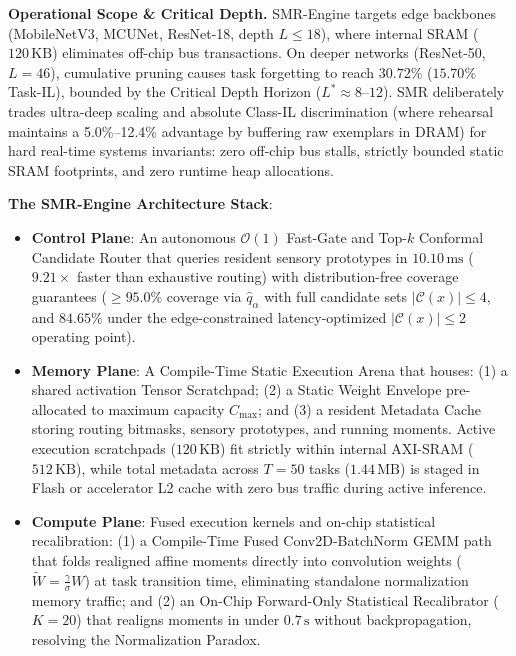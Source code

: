 \documentclass{article}
\begin{document}
\noindent\textbf{Operational Scope \& Critical Depth.} SMR-Engine targets edge backbones (MobileNetV3, MCUNet, ResNet-18, depth $L \le 18$), where internal SRAM ($120\,\text{KB}$) eliminates off-chip bus transactions. On deeper networks (ResNet-50, $L=46$), cumulative pruning causes task forgetting to reach $30.72\%$ ($15.70\%$ Task-IL), bounded by the Critical Depth Horizon ($L^* \approx 8\text{--}12$). SMR deliberately trades ultra-deep scaling and absolute Class-IL discrimination (where rehearsal maintains a 5.0\%--12.4\% advantage by buffering raw exemplars in DRAM) for hard real-time systems invariants: zero off-chip bus stalls, strictly bounded static SRAM footprints, and zero runtime heap allocations.

\noindent\textbf{The SMR-Engine Architecture Stack}:
\begin{itemize}\itemsep 0.5pt \parsep 0pt
    \item \textbf{Control Plane}: An autonomous $\mathcal{O}(1)$ Fast-Gate and Top-$k$ Conformal Candidate Router that queries resident sensory prototypes in $10.10\,\text{ms}$ ($9.21\times$ faster than exhaustive routing) with distribution-free coverage guarantees ($\ge 95.0\%$ coverage via $\hat{q}_\alpha$ with full candidate sets $|\mathcal{C}(x)| \le 4$, and $84.65\%$ under the edge-constrained latency-optimized $|\mathcal{C}(x)| \le 2$ operating point).
    \item \textbf{Memory Plane}: A Compile-Time Static Execution Arena that houses: (1) a shared activation Tensor Scratchpad; (2) a Static Weight Envelope pre-allocated to maximum capacity $C_{\max}$; and (3) a resident Metadata Cache storing routing bitmasks, sensory prototypes, and running moments. Active execution scratchpads ($120\,\text{KB}$) fit strictly within internal AXI-SRAM ($512\,\text{KB}$), while total metadata across $T=50$ tasks ($1.44\,\text{MB}$) is staged in Flash or accelerator L2 cache with zero bus traffic during active inference.
    \item \textbf{Compute Plane}: Fused execution kernels and on-chip statistical recalibration: (1) a Compile-Time Fused Conv2D-BatchNorm GEMM path that folds realigned affine moments directly into convolution weights ($\tilde{W} = \frac{\gamma}{\sigma} W$) at task transition time, eliminating standalone normalization memory traffic; and (2) an On-Chip Forward-Only Statistical Recalibrator ($K=20$) that realigns moments in under $0.7\,\text{s}$ without backpropagation, resolving the Normalization Paradox.
\end{itemize}
\end{document}
